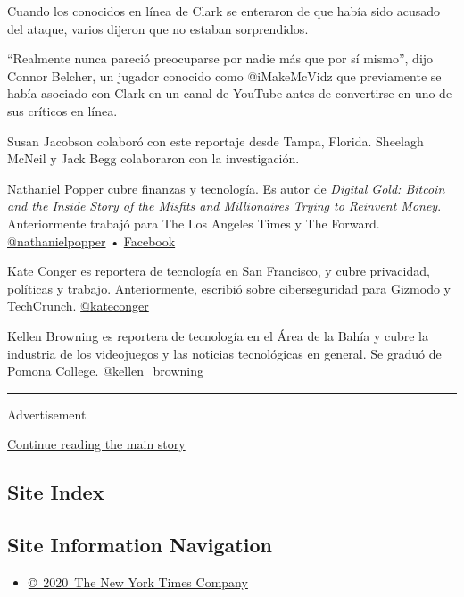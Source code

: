 Cuando los conocidos en línea de Clark se enteraron de que había sido
acusado del ataque, varios dijeron que no estaban sorprendidos.

``Realmente nunca pareció preocuparse por nadie más que por sí mismo'',
dijo Connor Belcher, un jugador conocido como @iMakeMcVidz que
previamente se había asociado con Clark en un canal de YouTube antes de
convertirse en uno de sus críticos en línea.

Susan Jacobson colaboró con este reportaje desde Tampa, Florida.
Sheelagh McNeil y Jack Begg colaboraron con la investigación.

Nathaniel Popper cubre finanzas y tecnología. Es autor de \emph{Digital
Gold: Bitcoin and the Inside Story of the Misfits and Millionaires
Trying to Reinvent Money}. Anteriormente trabajó para The Los Angeles
Times y The Forward.
\href{https://twitter.com/nathanielpopper}{@nathanielpopper} •
\href{https://www.facebook.com/nathanielvpopper}{Facebook}

Kate Conger es reportera de tecnología en San Francisco, y cubre
privacidad, políticas y trabajo. Anteriormente, escribió sobre
ciberseguridad para Gizmodo y TechCrunch.
\href{https://twitter.com/kateconger}{@kateconger}

Kellen Browning es reportera de tecnología en el Área de la Bahía y
cubre la industria de los videojuegos y las noticias tecnológicas en
general. Se graduó de Pomona College.
\href{https://twitter.com/kellen_browning}{@kellen\_browning}

\begin{center}\rule{0.5\linewidth}{\linethickness}\end{center}

Advertisement

\protect\hyperlink{after-bottom}{Continue reading the main story}

\hypertarget{site-index}{%
\subsection{Site Index}\label{site-index}}

\hypertarget{site-information-navigation}{%
\subsection{Site Information
Navigation}\label{site-information-navigation}}

\begin{itemize}
\tightlist
\item
  \href{https://help.nytimes.com/hc/en-us/articles/115014792127-Copyright-notice}{©~2020~The
  New York Times Company}
\end{itemize}

